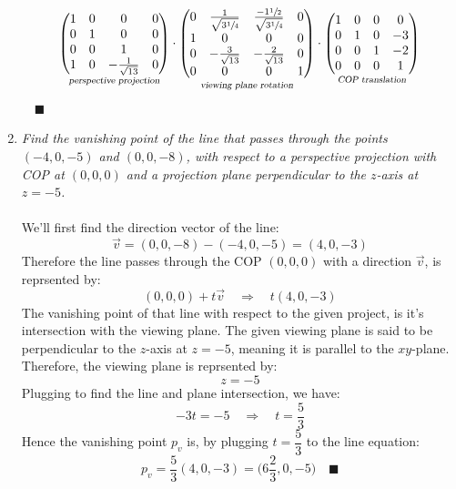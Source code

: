 \documentclass{article}
\newcommand{\proofend}{\quad\blacksquare}
\begin{document}
\begin{enumerate}
$$            \underset{\textsl{perspective projection}}{ \begin{pmatrix}
                1&0&0&0\\
                0&1&0&0\\
                0&0&1&0\\
                1&0&-\frac{1}{\sqrt{13}}&0
            \end{pmatrix}}
            \cdot
            \underset{\textsl{viewing plane rotation}}{\begin{pmatrix}
                0&\frac{1}{\sqrt{3\sfrac{1}{4}}}&\frac{-1\sfrac{1}{2}}{\sqrt{3\sfrac{1}{4}}}&0\\
                1&0&0&0\\
                0&-\frac{3}{\sqrt{13}}&-\frac{2}{\sqrt{13}}&0\\
                0&0&0&1
            \end{pmatrix}}\cdot
            \underset{\textsl{COP translation}}{\begin{pmatrix}
                1&0&0&0\\
                0&1&0&-3\\
                0&0&1&-2\\
                0&0&0&1
            \end{pmatrix}}
        $$
        $\proofend$
        \newpage
        \item \textsl{Find the vanishing point of the line that passes through the points $(-4,0,-5)$ and $(0,0,-8)$, with respect to a perspective projection with COP at $(0,0,0)$ and a projection plane perpendicular to the $z$-axis at $z=-5$.}\\\\
        We'll first find the direction vector of the line:
        $$\vec{v} = (0,0,-8) - (-4,0,-5) = (4,0,-3)$$
        Therefore the line passes through the COP $(0,0,0)$ with a direction $\vec{v}$, is reprsented by:
        $$(0,0,0) + t\vec{v} \quad\Longrightarrow\quad t(4,0,-3)$$
        The vanishing point of that line with respect to the given project, is it's intersection with the viewing plane. The given viewing plane is said to be perpendicular to the $z$-axis at $z=-5$, meaning it is parallel to the $xy$-plane. Therefore, the viewing plane is reprsented by:
        $$z = -5$$
        Plugging to find the line and plane intersection, we have:
        $$-3t = -5\quad\Longrightarrow\quad t = \dfrac{5}{3}$$
        Hence the vanishing point $p_v$ is, by plugging $t=\dfrac{5}{3}$ to the line equation:
        $$p_v = \dfrac{5}{3}(4,0,-3) = \boxed{\bigg(6\frac{2}{3}, 0, -5\bigg)}\proofend$$
    \end{enumerate}
\end{document}
